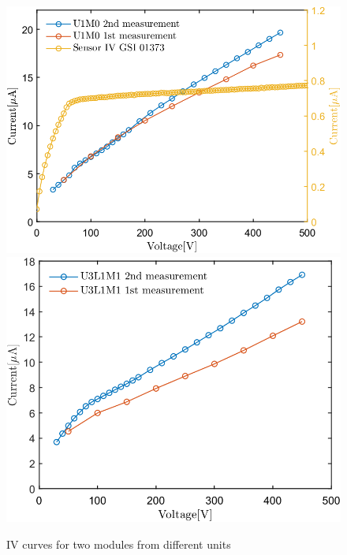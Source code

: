 \begin{figure}[h!]
\centering
\includegraphics[width=0.45\columnwidth]{Chapter5/DCS/images/IV/U1FEB1.png}
\includegraphics[width=0.45\columnwidth]{Chapter5/DCS/images/IV/U3L1FEB3.png}
\caption{IV curves for two modules from different units}
\label{fig_U3L1}
\end{figure}
